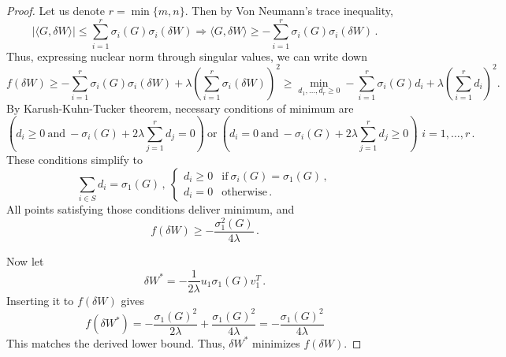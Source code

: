 \documentclass{article} %
\begin{document}
\begin{proof}
Let us denote $r = \min\{m, n\}$. Then by Von Neumann's trace inequality,
\begin{equation*}
    \vert\langle G, \delta W \rangle\vert \leq \sum_{i=1}^r \sigma_i(G)\sigma_i(\delta W)
    \Rightarrow
    \langle G, \delta W \rangle \geq -\sum_{i=1}^r \sigma_i(G)\sigma_i(\delta W)\,.
\end{equation*}
Thus, expressing nuclear norm through singular values, we can write down
\begin{equation*}
    f(\delta W) \geq -\sum_{i=1}^r \sigma_i(G)\sigma_i(\delta W) + \lambda\left(\sum_{i=1}^{r}\sigma_i(\delta W)\right)^2 \geq \min_{d_1,\dots,d_r \geq 0}-\sum_{i=1}^r \sigma_i(G)d_i + \lambda\left(\sum_{i=1}^{r}d_i\right)^2.
\end{equation*}
By Karush-Kuhn-Tucker theorem, necessary conditions of minimum are
\begin{equation*}
    \left(d_i \geq 0\ \text{and}\ -\sigma_i(G) + 2\lambda\sum_{j=1}^{r}d_j = 0\right)\ \text{or}\ \left(d_i = 0\ \text{and}\ -\sigma_i(G) + 2\lambda\sum_{j=1}^{r}d_j \geq 0\right) \,\, i = 1,\dots,r\,.
\end{equation*}
These conditions simplify to 
\begin{equation*}
    \sum_{i \in S}d_i = \sigma_1(G)\,,\ \begin{cases}
        d_i \geq 0 & \text{if}\ \sigma_i(G) = \sigma_1(G)\,, \\
        d_i = 0 & \text{otherwise}\,.
    \end{cases}
\end{equation*}
All points satisfying those conditions deliver minimum, and
\begin{equation*}
    f(\delta W) \geq -\frac{\sigma_1^2(G)}{4\lambda}\,.
\end{equation*}

Now let
\begin{equation*}
    \delta W^* = -\frac{1}{2\lambda} u_1 \sigma_1(G) v_1^T\,.
\end{equation*}
Inserting it to $f(\delta W)$ gives
\begin{equation*}
    f\left(\delta W^*\right) = -\frac{\sigma_1(G)^2}{2\lambda} + \frac{\sigma_1(G)^2}{4\lambda} = -\frac{\sigma_1(G)^2}{4\lambda}
\end{equation*}
This matches the derived lower bound. Thus, $\delta W^*$ minimizes $f(\delta W)$.
\end{proof}
\end{document}
